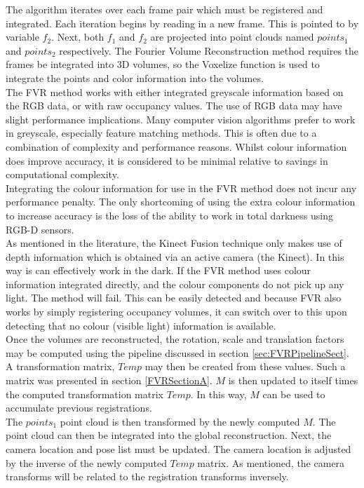The algorithm iterates over each frame pair which must be registered and integrated. Each iteration begins by reading in a new frame. This is pointed to by variable $f_2$. Next, both $f_1$ and $f_2$ are projected into point clouds named $points_1$ and $points_2$ respectively. The Fourier Volume Reconstruction method requires the frames be integrated into 3D volumes, so the Voxelize function is used to integrate the points and color information into the volumes. \\

The FVR method works with either integrated greyscale information based on the RGB data, or with raw occupancy values. The use of RGB data may have slight performance implications. Many computer vision algorithms prefer to work in greyscale, especially feature matching methods. This is often due to a combination of complexity and performance reasons. Whilst colour information does improve accuracy, it is considered to be minimal relative to savings in computational complexity. \\

Integrating the colour information for use in the FVR method does not incur any performance penalty. The only shortcoming of using the extra colour information to increase accuracy is the loss of the ability to work in total darkness using RGB-D sensors. \\

As mentioned in the literature, the Kinect Fusion technique only makes use of depth information which is obtained via an active camera (the Kinect). In this way is can effectively work in the dark. If the FVR method uses colour information integrated directly, and the colour components do not pick up any light. The method will fail. This can be easily detected and because FVR also works by simply registering occupancy volumes, it can switch over to this upon detecting that no colour (visible light) information is available. \\

Once the volumes are reconstructed, the rotation, scale and translation factors may be computed using the pipeline discussed in section \ref{sec:FVRPipelineSect}. A transformation matrix, $Temp$ may then be created from these values. Such a matrix was presented in section \ref{FVRSectionA}. $M$ is then updated to itself times the computed transformation matrix $Temp$. In this way, $M$ can be used to accumulate previous registrations. \\

The $points_1$ point cloud is then transformed by the newly computed $M$. The point cloud can then be integrated into the global reconstruction. Next, the camera location and pose list must be updated. The camera location is adjusted by the inverse of the newly computed $Temp$ matrix. As mentioned, the camera transforms will be related to the registration transforms inversely. \\

